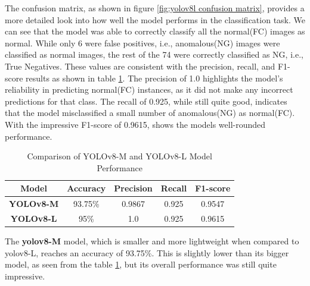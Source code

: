 The confusion matrix, as shown in figure \ref{fig:yolov8l confusion matrix}, provides a more detailed look into how well the model performs in the classification task. We can see that the model was able to correctly classify all the normal(FC) images as normal. While only 6 were false positives, i.e., anomalous(NG) images were classified as normal images, the rest of the 74 were correctly classified as NG, i.e., True Negatives. These values are consistent with the precision, recall, and F1-score results as shown in table \ref{tab:yolov8_performance}. The precision of 1.0 highlights the model's reliability in predicting normal(FC) instances, as it did not make any incorrect predictions for that class. The recall of 0.925, while still quite good, indicates that the model misclassified a small number of anomalous(NG) as normal(FC). With the impressive F1-score of 0.9615, shows the models well-rounded performance.

\begin{table}[ht!]
    \centering
    \begin{tabular}{|c|c|c|c|c|}
        \hline
        \textbf{Model} & \textbf{Accuracy} & \textbf{Precision} & \textbf{Recall} & \textbf{F1-score} \\ \hline
        \textbf{YOLOv8-M} & 93.75\% & 0.9867 & 0.925 & 0.9547 \\ \hline
        \textbf{YOLOv8-L} & 95\% & 1.0 & 0.925 & 0.9615 \\ \hline
    \end{tabular}
    \caption{Comparison of YOLOv8-M and YOLOv8-L Model Performance}
    \label{tab:yolov8_performance}
\end{table}


The \textbf{\gls{yolo}v8-M} model, which is smaller and more lightweight when compared to \gls{yolo}v8-L, reaches an accuracy of 93.75\%. This is slightly lower than its bigger model, as seen from the table \ref{tab:yolov8_performance}, but its overall performance was still quite impressive.

